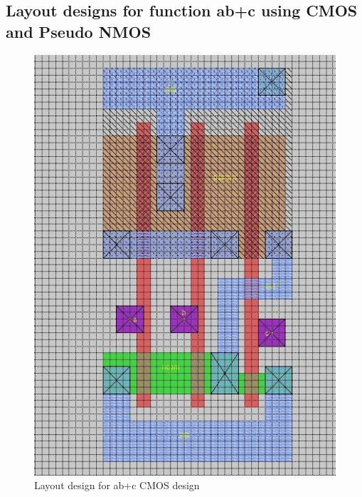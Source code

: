 \documentclass[12pt,a4paper]{article}
\begin{document}
\begin{center}
\subsection{Layout designs for  function ab+c using CMOS and Pseudo NMOS}
\begin{figure}[h]
\centering
\includegraphics[scale=.33]{ab+ccmos.jpg}
\caption[Short]{Layout design for ab+c CMOS design}
\end{figure}



\end{center}
\end{document}
